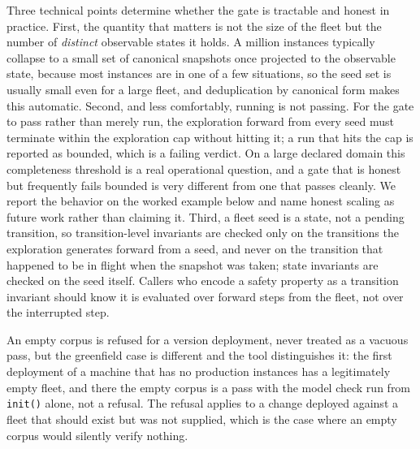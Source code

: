 \documentclass[11pt]{article}
\newcommand{\code}[1]{\texttt{#1}}
\begin{document}
Three technical points determine whether the gate is tractable and honest in
practice. First, the quantity that matters is not the size of the fleet but the
number of \emph{distinct} observable states it holds. A million instances
typically collapse to a small set of canonical snapshots once projected to the
observable state, because most instances are in one of a few situations, so the
seed set is usually small even for a large fleet, and deduplication by canonical
form makes this automatic. Second, and less comfortably, running is not passing.
For the gate to pass rather than merely run, the exploration forward from every
seed must terminate within the exploration cap without hitting it; a run that
hits the cap is reported as bounded, which is a failing verdict. On a large
declared domain this completeness threshold is a real operational question, and
a gate that is honest but frequently fails bounded is very different from one
that passes cleanly. We report the behavior on the worked example below and name
honest scaling as future work rather than claiming it. Third, a fleet seed is a
state, not a pending transition, so transition-level invariants are checked only
on the transitions the exploration generates forward from a seed, and never on
the transition that happened to be in flight when the snapshot was taken; state
invariants are checked on the seed itself. Callers who encode a safety property
as a transition invariant should know it is evaluated over forward steps from
the fleet, not over the interrupted step.

An empty corpus is refused for a version deployment, never treated as a vacuous
pass, but the greenfield case is different and the tool distinguishes it: the
first deployment of a machine that has no production instances has a legitimately
empty fleet, and there the empty corpus is a pass with the model check run from
\code{init()} alone, not a refusal. The refusal applies to a change deployed
against a fleet that should exist but was not supplied, which is the case where an
empty corpus would silently verify nothing.
\end{document}
